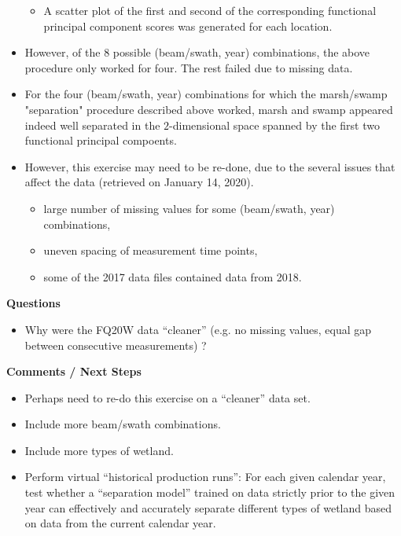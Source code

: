 \begin{itemize}
\begin{itemize}
	\item
		A scatter plot of the first and second of the corresponding
		functional principal component scores was generated for each location. 
	\end{itemize}
\item
	However, of the $8$ possible (beam/swath, year) combinations,
	the above procedure only worked for four. The rest failed due to missing data.
\item
	For the four (beam/swath, year) combinations for which the marsh/swamp "separation" procedure
	described above worked, marsh and swamp appeared indeed well separated
	in the $2$-dimensional space spanned by the first two functional principal compoents.
\item
	However, this exercise may need to be re-done, due to the several issues that
	affect the data (retrieved on January 14, 2020).
	\begin{itemize}
	\item
		large number of missing values for some (beam/swath, year) combinations,
	\item
		uneven spacing of measurement time points,
	\item
		some of the 2017 data files contained data from 2018.
	\end{itemize}
\end{itemize}


\vskip 0.5cm
\noindent
\textbf{Questions}
\begin{itemize}
\item
	Why were the FQ20W data ``cleaner'' (e.g. no missing values, equal gap between consecutive measurements) ?
\end{itemize}


\vskip 0.5cm
\noindent
\textbf{Comments / Next Steps}
\begin{itemize}
\item
	Perhaps need to re-do this exercise on a ``cleaner'' data set.
\item
	Include more beam/swath combinations.
\item
	Include more types of wetland.
\item
	Perform virtual ``historical production runs'': 
	For each given calendar year, test whether a ``separation model''
	trained on data strictly prior to the given year can effectively and accurately separate
	different types of wetland based on data from the current calendar year.
\end{itemize}


\renewcommand{\theenumi}{\roman{enumi}}
\renewcommand{\labelenumi}{\textnormal{(\theenumi)}$\;\;$}

